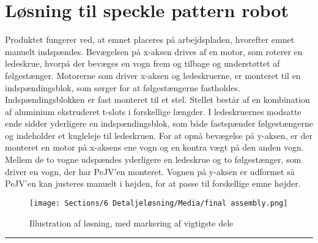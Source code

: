 \section{Løsning til speckle pattern robot} \label{Produkt}
Produktet fungerer ved, at emnet placeres på arbejdspladen, hvorefter emnet manuelt indspændes. Bevægelsen på x-aksen drives af en motor, som roterer en ledeskrue, hvorpå der bevæges en vogn frem og tilbage og understøttet af følgestænger. Motorerne som driver x-aksen og ledeskruerne, er monteret til en indspændingsblok, som sørger for at følgestængerne fastholdes. Indspændingsblokken er fast monteret til et stel. Stellet består af en kombination af aluminium ekstruderet t-slots i forskellige længder. I ledeskruernes modsatte ende sidder yderligere en indspændingsblok, som både fastspænder følgestængerne og indeholder et kugleleje til ledeskruen. For at opnå bevægelse på y-aksen, er der monteret en motor på x-aksens ene vogn og en kontra vægt på den anden vogn. Mellem de to vogne udspændes yderligere en ledeskrue og to følgestænger, som driver en vogn, der har PeJV'en monteret. Vognen på y-aksen er udformet så PeJV'en kan justeres manuelt i højden, for at passe til forskellige emne højder. 
\begin{figure}[H]
    \centering
    \texttt{[image: Sections/6 Detaljeløsning/Media/final assembly.png]}
    \caption{Illustration af løsning, med markering af vigtigste dele}
    \label{fig: skitse med navne}
\end{figure} \plainbreak{-1}

 


